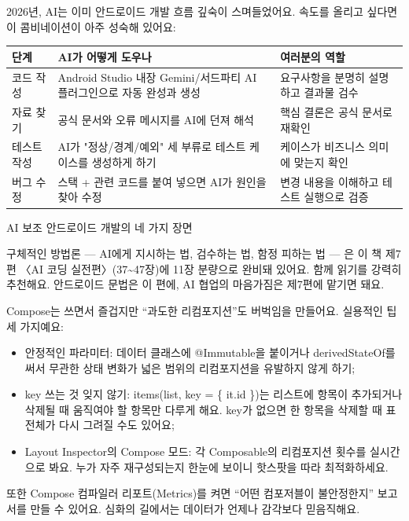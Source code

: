 2026년, AI는 이미 안드로이드 개발 흐름 깊숙이 스며들었어요. 속도를 올리고 싶다면 이 콤비네이션이 아주 성숙해 있어요:

\begin{center}
\begin{tabularx}{\linewidth}{|X|X|X|}
\hline
\textbf{단계} & \textbf{AI가 어떻게 도우나} & \textbf{여러분의 역할} \tabularnewline
\hline
코드 작성 & Android Studio 내장 Gemini/서드파티 AI 플러그인으로 자동 완성과 생성 & 요구사항을 분명히 설명하고 결과물 검수 \tabularnewline
자료 찾기 & 공식 문서와 오류 메시지를 AI에 던져 해석 & 핵심 결론은 공식 문서로 재확인 \tabularnewline
테스트 작성 & AI가 "정상/경계/예외" 세 부류로 테스트 케이스를 생성하게 하기 & 케이스가 비즈니스 의미에 맞는지 확인 \tabularnewline
버그 수정 & 스택 + 관련 코드를 붙여 넣으면 AI가 원인을 찾아 수정 & 변경 내용을 이해하고 테스트 실행으로 검증 \tabularnewline
\hline
\end{tabularx}
\end{center}

\begin{center}\small\color{gray}AI 보조 안드로이드 개발의 네 가지 장면\end{center}

구체적인 방법론 — AI에게 지시하는 법, 검수하는 법, 함정 피하는 법 — 은 이 책 제7편 〈AI 코딩 실전편〉(37\textasciitilde{}47장)에 11장 분량으로 완비돼 있어요. 함께 읽기를 강력히 추천해요. 안드로이드 문법은 이 편에, AI 협업의 마음가짐은 제7편에 맡기면 돼요.


Compose는 쓰면서 즐겁지만 “과도한 리컴포지션”도 버벅임을 만들어요. 실용적인 팁 세 가지예요:

\begin{itemize}
  \item 안정적인 파라미터: 데이터 클래스에 @Immutable을 붙이거나 derivedStateOf를 써서 무관한 상태 변화가 넓은 범위의 리컴포지션을 유발하지 않게 하기;
  \item key 쓰는 것 잊지 않기: items(list, key = \{ it.id \})는 리스트에 항목이 추가되거나 삭제될 때 움직여야 할 항목만 다루게 해요. key가 없으면 한 항목을 삭제할 때 표 전체가 다시 그려질 수도 있어요;
  \item Layout Inspector의 Compose 모드: 각 Composable의 리컴포지션 횟수를 실시간으로 봐요. 누가 자주 재구성되는지 한눈에 보이니 핫스팟을 따라 최적화하세요.
\end{itemize}

또한 Compose 컴파일러 리포트(Metrics)를 켜면 “어떤 컴포저블이 불안정한지” 보고서를 만들 수 있어요. 심화의 길에서는 데이터가 언제나 감각보다 믿음직해요.

